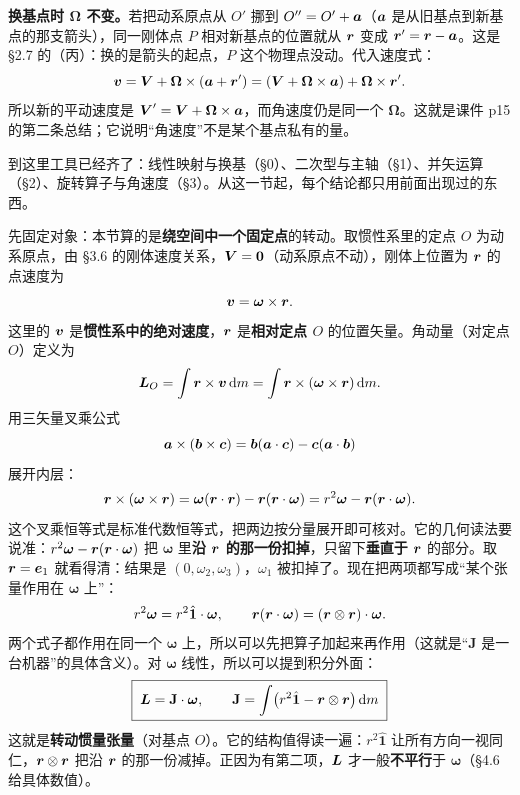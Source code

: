 \documentclass[11pt]{ctexart}
\newcommand{\ten}[1]{\mathbf{#1}}
\newcommand{\unitd}{\hat{\ten{1}}}
\let\orighdr\hdr
\renewcommand{\hdr}[2]{\par\needspace{10\baselineskip}\orighdr{#1}{#2}}
\let\origsubhdr\subhdr
\renewcommand{\subhdr}[1]{\par\needspace{3\baselineskip}\origsubhdr{#1}}
\begin{document}
\textbf{换基点时 $\boldsymbol\Omega$ 不变。}若把动系原点从 $O'$ 挪到 $O''=O'+\boldsymbol{a}$（$\boldsymbol{a}$ 是从旧基点到新基点的那支箭头），同一刚体点 $P$ 相对新基点的位置就从 $\boldsymbol{r}$ 变成 $\boldsymbol{r}'=\boldsymbol{r}-\boldsymbol{a}$。这是 \S2.7 的（丙）：换的是箭头的起点，$P$ 这个物理点没动。代入速度式：
\[
\boldsymbol{v}=\boldsymbol{V}+\boldsymbol\Omega\times(\boldsymbol{a}+\boldsymbol{r}')
=(\boldsymbol{V}+\boldsymbol\Omega\times\boldsymbol{a})+\boldsymbol\Omega\times\boldsymbol{r}' .
\]
所以新的平动速度是 $\boldsymbol{V}'=\boldsymbol{V}+\boldsymbol\Omega\times\boldsymbol{a}$，而角速度仍是同一个 $\boldsymbol\Omega$。这就是课件 p15 的第二条总结；它说明“角速度”不是某个基点私有的量。

\label{sec:inertia}

到这里工具已经齐了：线性映射与换基（\S0）、二次型与主轴（\S1）、并矢运算（\S2）、旋转算子与角速度（\S3）。从这一节起，每个结论都只用前面出现过的东西。

\label{subsec:inertia-construct}

先固定对象：本节算的是\textbf{绕空间中一个固定点}的转动。取惯性系里的定点 $O$ 为动系原点，由 \S3.6 的刚体速度关系，$\boldsymbol{V}=\boldsymbol{0}$（动系原点不动），刚体上位置为 $\boldsymbol{r}$ 的点速度为
\[
\boldsymbol{v}=\boldsymbol\omega\times\boldsymbol{r} .
\]
这里的 $\boldsymbol{v}$ 是\textbf{惯性系中的绝对速度}，$\boldsymbol{r}$ 是\textbf{相对定点 $O$} 的位置矢量。角动量（对定点 $O$）定义为
\[
\boldsymbol{L}_O=\int\boldsymbol{r}\times\boldsymbol{v}\,\mathrm{d} m
=\int\boldsymbol{r}\times(\boldsymbol\omega\times\boldsymbol{r})\,\mathrm{d} m .
\]
用三矢量叉乘公式
\[
\boldsymbol{a}\times(\boldsymbol{b}\times\boldsymbol{c})=\boldsymbol{b}(\boldsymbol{a}\cdot\boldsymbol{c})-\boldsymbol{c}(\boldsymbol{a}\cdot\boldsymbol{b})
\]
展开内层：
\[
\boldsymbol{r}\times(\boldsymbol\omega\times\boldsymbol{r})
=\boldsymbol\omega(\boldsymbol{r}\cdot\boldsymbol{r})-\boldsymbol{r}(\boldsymbol{r}\cdot\boldsymbol\omega)
=r^2\boldsymbol\omega-\boldsymbol{r}(\boldsymbol{r}\cdot\boldsymbol\omega).
\]
这个叉乘恒等式是标准代数恒等式，把两边按分量展开即可核对。它的几何读法要说准：$r^2\boldsymbol\omega-\boldsymbol{r}(\boldsymbol{r}\cdot\boldsymbol\omega)$ 把 $\boldsymbol\omega$ 里\textbf{沿 $\boldsymbol{r}$ 的那一份扣掉}，只留下\textbf{垂直于 $\boldsymbol{r}$} 的部分。取 $\boldsymbol{r}=\boldsymbol{e}_1$ 就看得清：结果是 $(0,\omega_2,\omega_3)$，$\omega_1$ 被扣掉了。现在把两项都写成“某个张量作用在 $\boldsymbol\omega$ 上”：
\[
r^2\boldsymbol\omega=r^2\unitd\cdot\boldsymbol\omega,
\qquad
\vect r(\vect r\cdot\boldsymbol\omega)=(\vect r\otimes\vect r)\cdot\boldsymbol\omega .
\]
两个式子都作用在同一个 $\boldsymbol\omega$ 上，所以可以先把算子加起来再作用（这就是“$\ten J$ 是一台机器”的具体含义）。对 $\boldsymbol\omega$ 线性，所以可以提到积分外面：
\[
\boxed{\;\vect L=\ten J\cdot\boldsymbol\omega,\qquad
\ten J=\int\bigl(r^2\unitd-\vect r\otimes\vect r\bigr)\dd m\;}
\]
这就是\textbf{转动惯量张量}（对基点 $O$）。它的结构值得读一遍：$r^2\unitd$ 让所有方向一视同仁，$\boldsymbol{r}\otimes\boldsymbol{r}$ 把沿 $\boldsymbol{r}$ 的那一份减掉。正因为有第二项，$\boldsymbol{L}$ 才一般\textbf{不平行}于 $\boldsymbol\omega$（\S4.6 给具体数值）。
\end{document}
